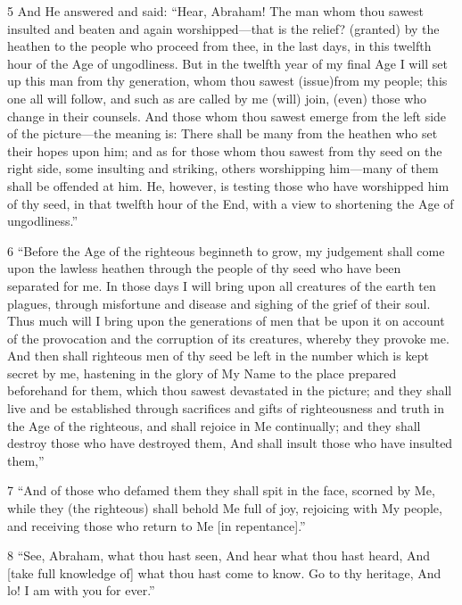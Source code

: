 \par 5 And He answered and said: “Hear, Abraham! The man whom thou sawest insulted and beaten and again worshipped—that is the relief? (granted) by the heathen to the people who proceed from thee, in the last days, in this twelfth hour of the Age of ungodliness. But in the twelfth year of my final Age I will set up this man from thy generation, whom thou sawest (issue)from my people; this one all will follow, and such as are called by me (will) join, (even) those who change in their counsels. And those whom thou sawest emerge from the left side of the picture—the meaning is: There shall be many from the heathen who set their hopes upon him; and as for those whom thou sawest from thy seed on the right side, some insulting and striking, others worshipping him—many of them shall be offended at him. He, however, is testing those who have worshipped him of thy seed, in that twelfth hour of the End, with a view to shortening the Age of ungodliness.”

\par 6 “Before the Age of the righteous beginneth to grow, my judgement shall come upon the lawless heathen through the people of thy seed who have been separated for me. In those days I will bring upon all creatures of the earth ten plagues, through misfortune and disease and sighing of the grief of their soul. Thus much will I bring upon the generations of men that be upon it on account of the provocation and the corruption of its creatures, whereby they provoke me. And then shall righteous men of thy seed be left in the number which is kept secret by me, hastening in the glory of My Name to the place prepared beforehand for them, which thou sawest devastated in the picture; and they shall live and be established through sacrifices and gifts of righteousness and truth in the Age of the righteous, and shall rejoice in Me continually; and they shall destroy those who have destroyed them, And shall insult those who have insulted them,”

\par 7 “And of those who defamed them they shall spit in the face, scorned by Me, while they (the righteous) shall behold Me full of joy, rejoicing with My people, and receiving those who return to Me [in repentance].”

\par 8 “See, Abraham, what thou hast seen, And hear what thou hast heard, And [take full knowledge of] what thou hast come to know. Go to thy heritage, And lo! I am with you for ever.”

